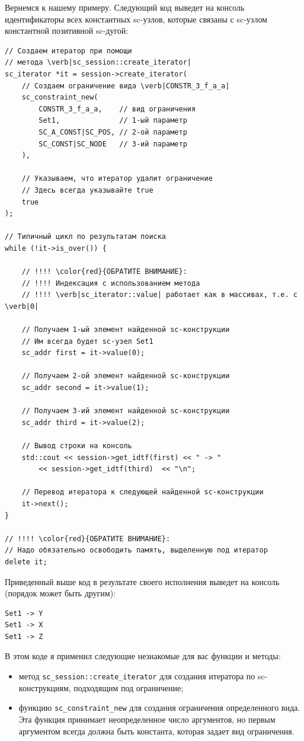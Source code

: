 Вернемся к нашему примеру. Следующий код выведет на консоль
идентификаторы всех константных sc-узлов, которые связаны с sc-узлом
 константной позитивной sc-дугой:
\begin{lstlisting}[texcl]
// Создаем итератор при помощи
// метода \verb|sc_session::create_iterator|
sc_iterator *it = session->create_iterator(
    // Создаем ограничение вида \verb|CONSTR_3_f_a_a|
    sc_constraint_new(
        CONSTR_3_f_a_a,    // вид ограничения
        Set1,              // 1-ый параметр
        SC_A_CONST|SC_POS, // 2-ой параметр
        SC_CONST|SC_NODE   // 3-ий параметр
    ),

    // Указываем, что итератор удалит ограничение
    // Здесь всегда указывайте true
    true
);

// Типичный цикл по результатам поиска
while (!it->is_over()) {

    // !!!! \color{red}{ОБРАТИТЕ ВНИМАНИЕ}:
    // !!!! Индексация с использованием метода
    // !!!! \verb|sc_iterator::value| работает как в массивах, т.е. с \verb|0|

    // Получаем 1-ый элемент найденной sc-конструкции
    // Им всегда будет sc-узел Set1
    sc_addr first = it->value(0);

    // Получаем 2-ой элемент найденной sc-конструкции
    sc_addr second = it->value(1);

    // Получаем 3-ий элемент найденной sc-конструкции
    sc_addr third = it->value(2);

    // Вывод строки на консоль
    std::cout << session->get_idtf(first) << " -> "
        << session->get_idtf(third)  << "\n";

    // Перевод итератора к следующей найденной sc-конструкции
    it->next();
}

// !!!! \color{red}{ОБРАТИТЕ ВНИМАНИЕ}:
// Надо обязательно освободить память, выделенную под итератор
delete it;
\end{lstlisting}

Приведенный выше код в результате своего исполнения выведет на консоль
(порядок может быть другим):
\begin{verbatim}
Set1 -> Y
Set1 -> X
Set1 -> Z
\end{verbatim}

В этом коде я применил следующие незнакомые для вас функции и методы:
\begin{itemize}
\item метод \lstinline|sc_session::create_iterator| для создания
  итератора по sc-конструкциям, подходящим под ограничение;
\item функцию \lstinline|sc_constraint_new| для создания ограничения
  определенного вида. Эта функция принимает неопределенное число
  аргументов, но первым аргументом всегда должна быть константа,
  которая задает вид ограничения.
\end{itemize}

